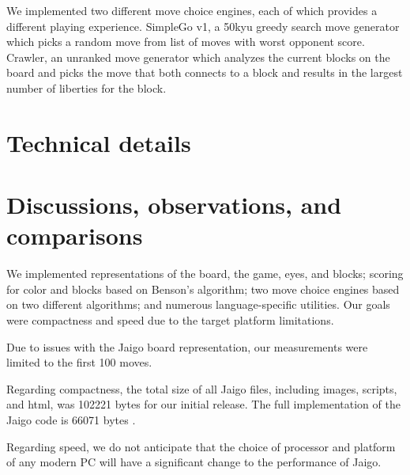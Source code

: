 \documentclass{memoir}
\begin{document}
We implemented two different move choice engines, each of which provides a different playing experience. SimpleGo v1, a 50kyu greedy search move generator which picks a random move from list of moves with worst opponent score. Crawler, an unranked move generator which analyzes the current blocks on the board and picks the move that both connects to a block and results in the largest number of liberties for the block.

\chapter{Technical details}
\lstset{language=Java,breaklines=true}%




\chapter{Discussions, observations, and comparisons}
We implemented representations of the board, the game, eyes, and blocks; scoring for color and blocks based on Benson's algorithm; two move choice engines based on two different algorithms; and numerous language-specific utilities. Our goals were compactness and speed due to the target platform limitations.

Due to issues with the Jaigo board representation, our measurements were limited to the first 100 moves.

Regarding compactness, the total size of all Jaigo files, including images, scripts, and html, was 102221 bytes for our initial release. The full implementation of the Jaigo code is 66071 bytes \cite{SpeedReport}.

Regarding speed, we do not anticipate that the choice of processor and platform of any modern PC will have a significant change to the performance of Jaigo.
\end{document}
